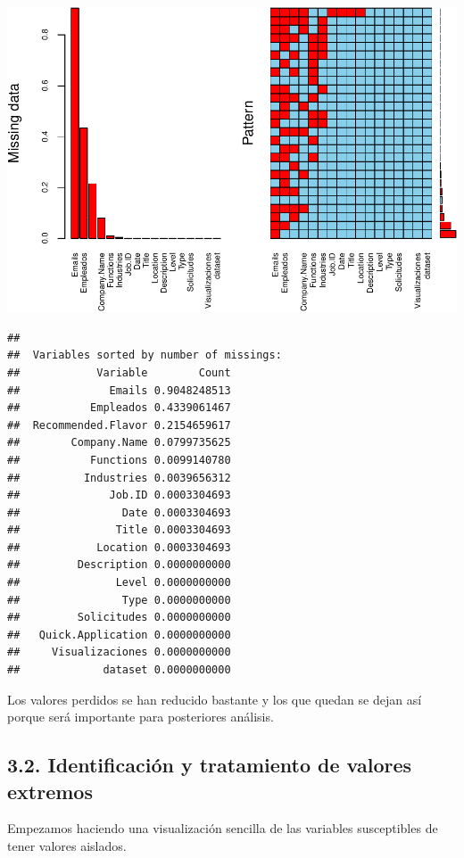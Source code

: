 \documentclass[
]{article}
\begin{document}
\includegraphics{data_cleaning_files/figure-latex/unnamed-chunk-16-1.pdf}

\begin{verbatim}
## 
##  Variables sorted by number of missings: 
##            Variable        Count
##              Emails 0.9048248513
##           Empleados 0.4339061467
##  Recommended.Flavor 0.2154659617
##        Company.Name 0.0799735625
##           Functions 0.0099140780
##          Industries 0.0039656312
##              Job.ID 0.0003304693
##                Date 0.0003304693
##               Title 0.0003304693
##            Location 0.0003304693
##         Description 0.0000000000
##               Level 0.0000000000
##                Type 0.0000000000
##         Solicitudes 0.0000000000
##   Quick.Application 0.0000000000
##     Visualizaciones 0.0000000000
##             dataset 0.0000000000
\end{verbatim}

Los valores perdidos se han reducido bastante y los que quedan se dejan
así porque será importante para posteriores análisis.

\hypertarget{identificacion-y-tratamiento-de-valores-extremos}{%
\subsection{3.2. Identificación y tratamiento de valores
extremos}\label{identificacion-y-tratamiento-de-valores-extremos}}

Empezamos haciendo una visualización sencilla de las variables
susceptibles de tener valores aislados.
\end{document}
